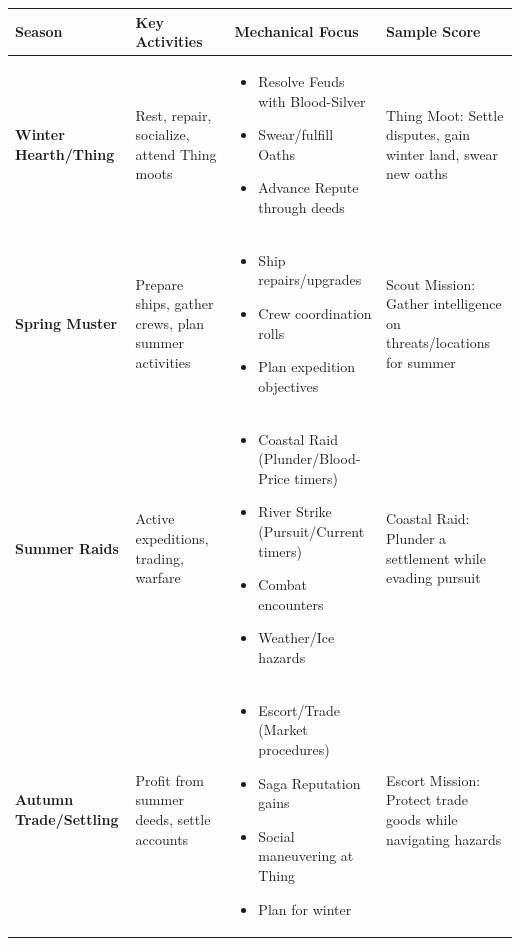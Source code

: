 \documentclass[11pt]{article}
\begin{document}
      \centering
      \caption{Linn: Mist \& Iron - The First Year (Quickstart)}
      \begin{longtable}{|>{\centering\arraybackslash}m{2.5cm}|>{\centering\arraybackslash}m{3cm}|>{\centering\arraybackslash}m{4cm}|>{\centering\arraybackslash}m{3.5cm}|}
      \hline
      \rowcolor{gray!20}
      \textbf{Season} & \textbf{Key Activities} & \textbf{Mechanical Focus} & \textbf{Sample Score} \\
      \hline
      \textbf{Winter Hearth/Thing} & Rest, repair, socialize, attend Thing moots & 
      \begin{itemize}
          \item Resolve Feuds with Blood-Silver
          \item Swear/fulfill Oaths
          \item Advance Repute through deeds
      \end{itemize} & 
      Thing Moot: Settle disputes, gain winter land, swear new oaths \\
      \hline
      \textbf{Spring Muster} & Prepare ships, gather crews, plan summer activities & 
      \begin{itemize}
          \item Ship repairs/upgrades
          \item Crew coordination rolls
          \item Plan expedition objectives
      \end{itemize} & 
      Scout Mission: Gather intelligence on threats/locations for summer \\
      \hline
      \textbf{Summer Raids} & Active expeditions, trading, warfare & 
      \begin{itemize}
          \item Coastal Raid (Plunder/Blood-Price timers)
          \item River Strike (Pursuit/Current timers)
          \item Combat encounters
          \item Weather/Ice hazards
      \end{itemize} & 
      Coastal Raid: Plunder a settlement while evading pursuit \\
      \hline
      \textbf{Autumn Trade/Settling} & Profit from summer deeds, settle accounts & 
      \begin{itemize}
          \item Escort/Trade (Market procedures)
          \item Saga Reputation gains
          \item Social maneuvering at Thing
          \item Plan for winter
      \end{itemize} & 
      Escort Mission: Protect trade goods while navigating hazards \\
      \hline
      \end{longtable}
      
\end{document}
